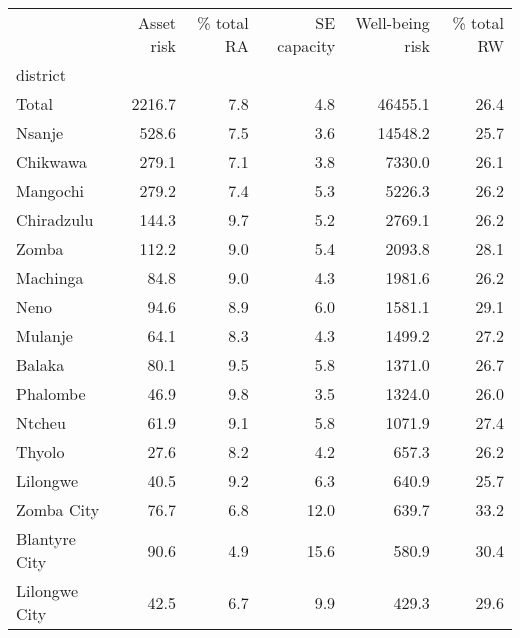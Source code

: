 \begin{tabular}{lrrrrr}
\toprule
{} &  Asset risk &  \% total RA &  SE capacity &  Well-being risk &  \% total RW \\
district      &             &             &              &                  &             \\
\midrule
Total         &      2216.7 &         7.8 &          4.8 &          46455.1 &        26.4 \\
Nsanje        &       528.6 &         7.5 &          3.6 &          14548.2 &        25.7 \\
Chikwawa      &       279.1 &         7.1 &          3.8 &           7330.0 &        26.1 \\
Mangochi      &       279.2 &         7.4 &          5.3 &           5226.3 &        26.2 \\
Chiradzulu    &       144.3 &         9.7 &          5.2 &           2769.1 &        26.2 \\
Zomba         &       112.2 &         9.0 &          5.4 &           2093.8 &        28.1 \\
Machinga      &        84.8 &         9.0 &          4.3 &           1981.6 &        26.2 \\
Neno          &        94.6 &         8.9 &          6.0 &           1581.1 &        29.1 \\
Mulanje       &        64.1 &         8.3 &          4.3 &           1499.2 &        27.2 \\
Balaka        &        80.1 &         9.5 &          5.8 &           1371.0 &        26.7 \\
Phalombe      &        46.9 &         9.8 &          3.5 &           1324.0 &        26.0 \\
Ntcheu        &        61.9 &         9.1 &          5.8 &           1071.9 &        27.4 \\
Thyolo        &        27.6 &         8.2 &          4.2 &            657.3 &        26.2 \\
Lilongwe      &        40.5 &         9.2 &          6.3 &            640.9 &        25.7 \\
Zomba City    &        76.7 &         6.8 &         12.0 &            639.7 &        33.2 \\
Blantyre City &        90.6 &         4.9 &         15.6 &            580.9 &        30.4 \\
Lilongwe City &        42.5 &         6.7 &          9.9 &            429.3 &        29.6 \\

\end{tabular}

